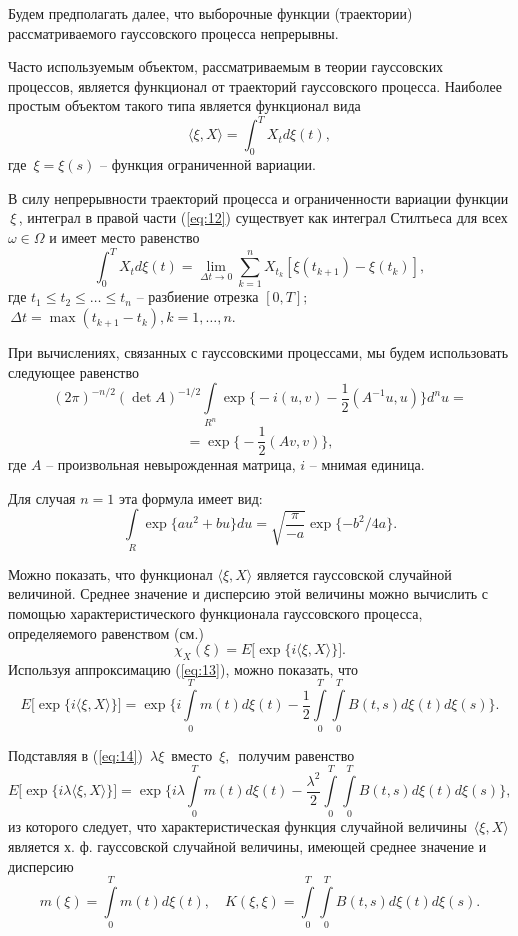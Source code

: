 \documentclass [a4paper, 12pt]{report}
\begin{document}
Будем предполагать далее, что выборочные функции (траектории) рассматриваемого
гауссовского процесса непрерывны.

  Часто используемым объектом, рассматриваемым в теории гауссовских процессов, является функционал
от траекторий гауссовского процесса. Наиболее простым
объектом такого типа является  функционал вида
\begin{equation}\label{eq:12}
\langle\xi,X\rangle=\int_0^T X_t d\xi(t),
\end{equation}
где $\,\xi=\xi(s)$ -- функция ограниченной вариации.

  В силу непрерывности траекторий
процесса и ограниченности вариации функции $\,\xi\,$, интеграл в правой
части (\ref{eq:12}) существует как интеграл Стилтьеса для всех $\omega\in \Omega$
и имеет место равенство
\begin{equation}\label{eq:13}
\int_0^T X_t d\xi(t)=\lim\limits_{\Delta t\rightarrow 0}
\sum\limits_{k=1}^n X_{t_k}[\xi(t_{k+1})-\xi(t_k)],
\end{equation}
где $t_1\leq t_2\leq\ldots\leq t_n$ -- разбиение отрезка $[0,T];$
$\,\Delta t=\max(t_{k+1}-t_k), k=1,\ldots,n.$

При вычислениях, связанных с гауссовскими процессами, мы будем использовать
следующее равенство
$$(2\pi)^{-n/2}(\det A)^{-1/2}
\int\limits_{R^n}\exp\Big\{-i(u,v)-\frac{1}{2}(A^{-1}u,u)\Big\} d^n u=$$
$$=\exp\Big\{-\frac{1}{2}(Av,v)\Big\},$$
где $A$ -- произвольная невырожденная матрица, $i$ -- мнимая единица.

Для случая $n=1$ эта формула имеет вид:
$$\int\limits_R \exp\{au^2+bu\}du=
\sqrt{\frac{\pi}{-a}}\exp\{-b^2/4a\}.$$

Можно показать, что функционал $\langle\xi,X\rangle$ является гауссовской
случайной величиной. Среднее значение и дисперсию этой величины
можно вычислить с помощью характеристического функционала гауссовского
процесса, определяемого равенством (см.\cite{lecture})
$$\chi_X(\xi)=E\Big[\exp\Big\{i\langle\xi,X\rangle\Big\}\Big].$$
Используя аппроксимацию (\ref{eq:13}), можно показать, что
\begin{equation}\label{eq:14}
E\Big[\exp\Big\{i\langle\xi,X\rangle\Big\}\Big]=\exp\Big\{
i\int\limits_0^T m(t)d\xi(t)-\frac{1}{2}\int\limits_0^T\int\limits_0^T
B(t,s)d\xi(t)d\xi(s)\Big\}.
\end{equation}

Подставляя в (\ref{eq:14}) $\,\lambda\xi\,$ вместо $\,\xi,\,$ получим равенство
$$E\Big[\exp\Big\{i\lambda\langle\xi,X\rangle\Big\}\Big]=
\exp\Big\{
i\lambda\int\limits_0^T m(t)d\xi(t)-
\frac{\lambda^2}{2}\int\limits_0^T\int\limits_0^T
B(t,s)d\xi(t)d\xi(s)\Big\},$$
из которого следует, что характеристическая функция случайной величины
$\,\langle\xi,X\rangle\,$ является х. ф. гауссовской случайной величины,
имеющей среднее значение и дисперсию
$$m(\xi)=\int\limits_0^T m(t)d\xi(t),\quad
K(\xi,\xi)=\int\limits_0^T\int\limits_0^T
B(t,s)d\xi(t)d\xi(s).$$
\end{document}
